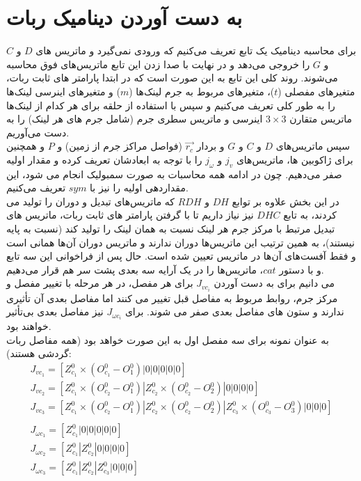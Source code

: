 \documentclass{article}
\begin{document}
\section{به دست آوردن دینامیک ربات}
برای محاسبه دینامیک یک تابع تعریف می‌کنیم که ورودی نمی‌گیرد و ماتریس های $D$ و $C$ و $G$ را خروجی می‌دهد و در نهایت با صدا زدن این تابع ماتریس‌های فوق محاسبه می‌شوند.
روند کلی این تابع به این صورت است که در ابتدا پارامتر های ثابت ربات، متغیر‌های مفصلی ($t$)، متغیر‌های مربوط به جرم لینک‌ها ($m$) و متغیر‌های اینرسی لینک‌ها را به طور کلی تعریف می‌کنیم و سپس با استفاده از حلقه برای هر کدام از لینک‌ها ماتریس متقارن $3\times3$ اینرسی و ماتریس سطری جرم (شامل جرم های هر لینک) را به دست می‌آوریم.
\\
سپس ماتریس‌های $D$ و $C$ و $G$ و بردار  $\overrightarrow{r_c}$ (فواصل مراکز جرم از زمین) و $P$ و همچنین برای ژاکوبین ها، ماتریس‌های $j_{v}$ و $j_{\omega}$ را با توجه به ابعادشان تعریف کرده و مقدار اولیه صفر می‌دهیم. چون در ادامه همه محاسبات به صورت سمبولیک انجام می شود، این مقداردهی اولیه را نیز با $sym$ تعریف می‌کنیم.
\\
در این بخش علاوه بر توابع $DH$ و $RDH$ که ماتریس‌های تبدیل و دوران را تولید می کردند، به تابع $DHC$ نیز نیاز داریم تا با گرفتن پارامتر های ثابت ربات، ماتریس های تبدیل مرتبط با مرکز جرم هر لینک نسبت به همان لینک را تولید کند (نسبت به پایه نیستند)، به همین ترتیب این ماتریس‌ها دوران ندارند و ماتریس دوران آن‌ها همانی است و فقط آفست‌های آن‌ها در ماتریس  تعیین شده است.
حال پس از فراخوانی این سه تابع و با دستور $cat$، ماتریس‌ها را در یک آرایه سه بعدی پشت سر هم قرار می‌دهیم.
\\
می دانیم برای به دست آوردن $J_{vc_i}$ برای هر مفصل، در هر مرحله با تغییر مفصل و مرکز جرم، روابط مربوط به مفاصل قبل تغییر می کنند اما مفاصل بعدی آن تأثیری ندارند و ستون های مفاصل بعدی صفر می شوند. برای $J_{\omega c_i}$ نیز مفاصل بعدی بی‌تأثیر خواهند بود.
\\
به عنوان نمونه برای سه مفصل اول به این صورت خواهد بود (همه مفاصل ربات گردشی هستند):
\\
\begin{gather*}
J_{vc_{1}} = [Z_{c_{1}}^{0} \times (O_{c_{1}}^{0} - O_{1}^{0})|0|0|0|0|0] \\
J_{vc_{2}} = [Z_{c_{1}}^{0} \times (O_{c_{2}}^{0} - O_{1}^{0})|Z_{c_{2}}^{0} \times (O_{c_{2}}^{0} - O_{2}^{0})|0|0|0|0] \\
J_{vc_{3}} = [Z_{c_{1}}^{0} \times (O_{c_{2}}^{0} - O_{1}^{0})|Z_{c_{2}}^{0} \times (O_{c_{2}}^{0} - O_{2}^{0})|Z_{c_{3}}^{0} \times (O_{c_{3}}^{0} - O_{3}^{0})|0|0|0] \\
\\
J_{\omega c_{1}} = [Z_{c_{1}}^0|0|0|0|0|0]\\
J_{\omega c_{2}} = [Z_{c_{1}}^0|Z_{c_{2}}^0|0|0|0|0]\\
J_{\omega c_{3}} = [Z_{c_{1}}^0|Z_{c_{2}}^0|Z_{c_{3}}^0|0|0|0]\\
\end{gather*}
\end{document}
